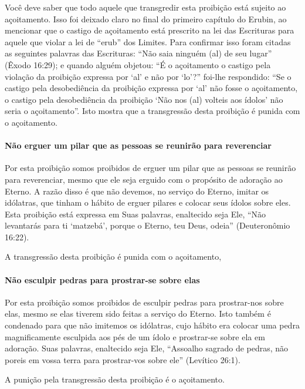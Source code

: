 Você deve saber que todo aquele que transgredir esta proibição está
sujeito ao açoitamento. Isso foi deixado claro no final do primeiro
capítulo do Erubin, ao mencionar que o castigo de açoitamento está
prescrito na lei das Escrituras para aquele que violar a lei de ``erub''
dos Limites. Para confirmar isso foram citadas as seguintes palavras das
Escrituras: ``Não saia ninguém (al) de seu lugar'' (Êxodo 16:29); e
quando alguém objetou: ``É o açoitamento o castigo pela violação da
proibição expressa por `al' e não por `lo'?'' foi-lhe respondido: ``Se o
castigo pela desobediência da proibição expressa por `al' não fosse o
açoitamento, o castigo pela desobediência da proibição `Não nos (al)
volteis aos ídolos' não seria o açoitamento''. Isto mostra que a
transgressão desta proibição é punida com o açoitamento.

\paragraph{Não erguer um pilar que as pessoas se reunirão para reverenciar}

Por esta proibição somos proibidos de erguer um pilar que as pessoas se
reunirão para reverenciar, mesmo que ele seja erguido com o propósito de
adoração ao Eterno. A razão disso é que não devemos, no serviço do
Eterno, imitar os idólatras, que tinham o hábito de erguer pilares e
colocar seus ídolos sobre eles. Esta proibição está expressa em Suas
palavras, enaltecido seja Ele, ``Não levantarás para ti `matzebá',
porque o Eterno, teu Deus, odeia'' (Deuteronômio 16:22).

A transgressão desta proibição é punida com o açoitamento,

\paragraph{Não esculpir pedras para prostrar-se sobre elas}

Por esta proibição somos proibidos de esculpir pedras para prostrar-nos
sobre elas, mesmo se elas tiverem sido feitas a serviço do Eterno. Isto
também é condenado para que não imitemos os idólatras, cujo hábito era
colocar uma pedra magnificamente esculpida aos pés de um ídolo e prostrar-se
sobre ela em adoração. Suas palavras, enaltecido seja Ele, ``Assoalho
sagrado de pedras, não poreis em vossa terra para prostrar-vos sobre
ele'' (Levítico 26:1).

A punição pela transgressão desta proibição é o açoitamento.

